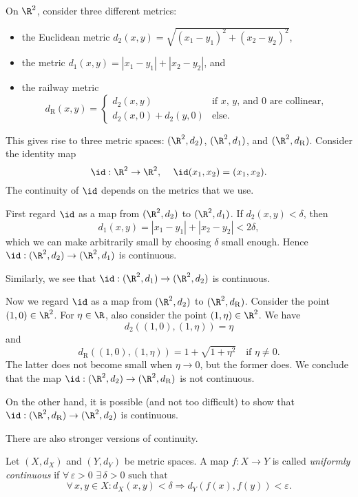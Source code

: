 \np

\begin{example}
On $\R^2$, consider three different metrics:
\begin{itemize}
\item the Euclidean metric $d_2(x,y) = \sqrt{(x_1 - y_1)^2 + (x_2 - y_2)^2}$,
\item the metric $d_1(x,y) = |x_1 - y_1| + |x_2 - y_2|$, and
\item the railway metric
\[
d_{\mathrm{R}}(x,y) = \begin{cases} d_2(x,y) & \text{if $x$, $y$, and $0$ are collinear}, \\ d_2(x,0) + d_2(y,0) & \text{else}. \end{cases}
\]
\end{itemize}
This gives rise to three metric spaces: $(\R^2,d_2)$, $(\R^2,d_1)$, and $(\R^2,d_{\mathrm{R}})$. Consider
the identity map 
$$
\id : \R^2 \to \R^2, \quad \, \id(x_1,x_2) = (x_1,x_2).
$$
The continuity of $\id$ depends on the metrics that we use.

First regard $\id$ as a map from $(\R^2,d_2)$ to $(\R^2,d_1)$. If $d_2(x,y) < \delta$, then
\[
d_1(x,y) = |x_1 - y_1| + |x_2 - y_2| < 2\delta,
\]%
which we can make arbitrarily small by choosing $\delta$ small enough. Hence
$\id : (\R^2,d_2) \to (\R^2,d_1)$ is continuous.

Similarly, we see that $\id : (\R^2,d_1) \to (\R^2,d_2)$ is continuous.

Now we regard $\id$ as a map from $(\R^2,d_2)$ to $(\R^2,d_{\mathrm{R}})$.
Consider the point $(1,0) \in \R^2$. For $\eta \in \R$, also consider the
point $(1,\eta) \in \R^2$. We have
\[
d_2((1,0),(1,\eta)) = \eta
\]
and
\[
d_{\mathrm{R}}((1,0),(1,\eta)) = 1 + \sqrt{1 + \eta^2} \quad \text{if $\eta \not= 0$}.
\]
The latter does not become small when $\eta \to 0$, but the former does.
We conclude that the map $\id: (\R^2,d_2) \to (\R^2,d_{\mathrm{R}})$ is not continuous.

On the other hand, it is possible (and not too difficult) to show that
$\id: (\R^2,d_{\mathrm{R}}) \to (\R^2,d_2)$ is continuous.
\end{example}

\np



There are also stronger versions of continuity.
\begin{definition}\label{cont:ms}
Let $(X,d_X)$ and $(Y,d_Y)$ be metric spaces. A map $f : X \to Y$
is called \emph{uniformly continuous} if
\bis\nl
$\forall\, \varepsilon > 0 \,\, \exists\, \delta > 0 \,\, \textrm{such that } \,$
\[
 \forall \, x, y \in X: d_X(x, y) < \delta \Rightarrow d_Y(f(x), f(y)) < \varepsilon.
\]
\end{definition}

